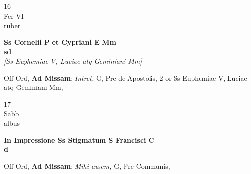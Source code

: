 \documentclass[10pt, openany]{book}
\begin{document}
        \begin{center}
            \begin{minipage}{3.5in}
                \vspace{2em}
                \begin{minipage}{0.5in}
                    {\Huge 16} \\
                    {\normalsize Fer VI} \\
                    {\normalsize ruber}
                \end{minipage}
                \begin{minipage}{3.0in}
                    \textbf{ \large Ss Cornelii P et Cypriani E Mm \\
                    \textnormal{\normalsize sd}} \\ \textit{[Ss Euphemiae V, Luciae atq Geminiani Mm]} \\ 
                \end{minipage}
                \begin{justify}Off Ord, \textbf{Ad Missam}: \textit{Intret,} G, Pre de Apostolis, 2 or Ss Euphemiae V, Luciae atq Geminiani Mm,  
                \end{justify}
            \end{minipage}
        \end{center}
    
        \begin{center}
            \begin{minipage}{3.5in}
                \vspace{2em}
                \begin{minipage}{0.5in}
                    {\Huge 17} \\
                    {\normalsize Sabb} \\
                    {\normalsize albus}
                \end{minipage}
                \begin{minipage}{3.0in}
                    \textbf{ \large In Impressione Ss Stigmatum S Francisci C \\
                    \textnormal{\normalsize d}} \\ 
                \end{minipage}
                \begin{justify}Off Ord, \textbf{Ad Missam}: \textit{Mihi autem,} G, Pre Communis,  
                \end{justify}
            \end{minipage}
        \end{center}
    
\end{document}

